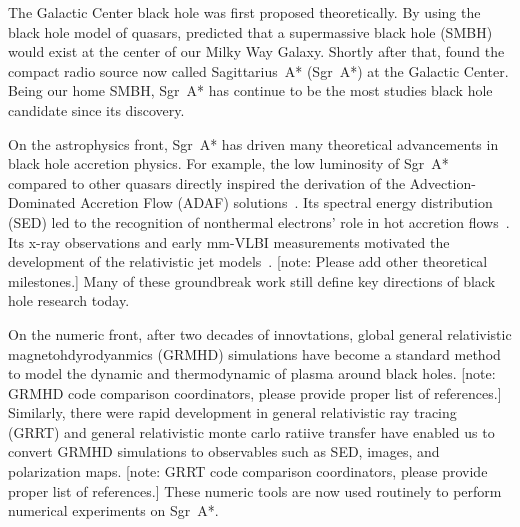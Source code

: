 \documentclass[twocolumn,tighten,dvipsnames]{aastex63}
\newcommand\sgra{Sgr~A*\xspace}
\newcommand\<{{\langle}}
\renewcommand\>{{\rangle}} %
\newcommand\note[1]{{\color{OliveGreen}[note: #1]}}
\begin{document}
The Galactic Center black hole was first proposed theoretically.
By using the black hole model of quasars, \citet{1971MNRAS.152..461L}
predicted that a supermassive black hole (SMBH) would exist at the
center of our Milky Way Galaxy.
Shortly after that, \citet{1974ApJ...194..265B, 1975A&A....43..159E,
  1975ApJ...202L..63L} found the compact radio source now called
Sagittarius~A* (\sgra) at the Galactic Center.
Being our home SMBH, \sgra has continue to be the most studies black
hole candidate since its discovery.

On the astrophysics front, \sgra has driven many theoretical
advancements in black hole accretion physics.
For example, the low luminosity of \sgra compared to other quasars
directly inspired the derivation of the Advection-Dominated Accretion
Flow (ADAF) solutions~\citep{1994ApJ...428L..13N, 1995ApJ...444..231N,
  1995ApJ...452..710N, 1996A&AS..120C.287N, 1998ApJ...492..554N}.
Its spectral energy distribution (SED) led to the recognition of
nonthermal electrons' role in hot accretion
flows~\citep{2000ApJ...541..234O}.
Its x-ray observations and early mm-VLBI measurements motivated the
development of the relativistic jet models~\citep{2000A&A...362..113F,
  2004A&A...414..895F, 2005ApJ...635.1203M}.
\note{Please add other theoretical milestones.}
Many of these groundbreak work still define key directions of black
hole research today.

On the numeric front, after two decades of innovtations, global
general relativistic magnetohdyrodyanmics (GRMHD) simulations
\citep[e.g.,][]{2000ApJ...528..462H, 2003ApJ...589..458D,
  2003ApJ...589..444G, 2007CQGra..24S.235G, 2012ApJS..201....9F,
  2014ApJ...796...22F, 2016ApJS..225...22W, 2017ApJS..231...17A,
  2018JPhCS1031a2008O, 2019A&A...629A..61O, 2019ApJS..243...26P} have
become a standard method to model the dynamic and thermodynamic of
plasma around black holes.
\note{GRMHD code comparison coordinators, please provide proper list
  of references.}
Similarly, there were rapid development in general relativistic ray
tracing (GRRT) \citep[e.g.,][]{2009ApJ...696.1616D,
  2012ApJ...745....1P, 2013ApJ...777...11S, 2013ApJ...777...13C,
  2016MNRAS.462..115D, 2016ApJ...820..105P, 2018ApJ...867...59C,
  2018A&A...613A...2B, 2020ApJ...897..148G, 2020arXiv200703045B} and
general relativistic monte carlo ratiive transfer
\citep{2009ApJS..184..387D, 2020MNRAS.491.4807M} have enabled us to
convert GRMHD simulations to observables such as SED, images, and
polarization maps.
\note{GRRT code comparison coordinators, please provide proper list of
  references.}
These numeric tools are now used routinely to perform numerical
experiments on \sgra.
\end{document}

